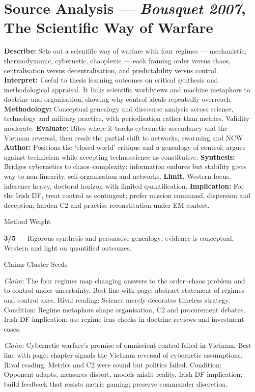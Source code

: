 \section*{Source Analysis — \textit{Bousquet 2007}, The Scientific Way of Warfare}
\textbf{Describe:} Sets out a scientific way of warfare with four regimes — mechanistic, thermodynamic, cybernetic, chaoplexic — each framing order versus chaos, centralisation versus decentralisation, and predictability versus control.
\textbf{Interpret:} Useful to thesis learning outcomes on critical synthesis and methodological appraisal. It links scientific worldviews and machine metaphors to doctrine and organisation, showing why control ideals repeatedly overreach.
\textbf{Methodology:} Conceptual genealogy and discourse analysis across science, technology and military practice, with periodisation rather than metrics. Validity moderate.
\textbf{Evaluate:} Bites where it tracks cybernetic ascendancy and the Vietnam reversal, then reads the partial shift to networks, swarming and NCW.
\textbf{Author:} Positions the ‘closed world’ critique and a genealogy of control; argues against technicism while accepting technoscience as constitutive.
\textbf{Synthesis:} Bridges cybernetics to chaos–complexity: information endures but stability gives way to non-linearity, self-organisation and networks.
\textbf{Limit.} Western focus, inference heavy, doctoral horizon with limited quantification.
\textbf{Implication:} For the Irish DF, treat control as contingent; prefer mission command, dispersion and deception; harden C2 and practise reconstitution under EM contest.

Method Weight

\textbf{3/5} — Rigorous synthesis and persuasive genealogy; evidence is conceptual, Western and light on quantified outcomes.

Claims-Cluster Seeds

\textit{Claim:} The four regimes map changing answers to the order–chaos problem and to control under uncertainty.
Best line with page: abstract statement of regimes and control axes.
Rival reading: Science merely decorates timeless strategy.
Condition: Regime metaphors shape organisation, C2 and procurement debates.
Irish DF implication: use regime-lens checks in doctrine reviews and investment cases.

\textit{Claim:} Cybernetic warfare’s promise of omniscient control failed in Vietnam.
Best line with page: chapter signals the Vietnam reversal of cybernetic assumptions.
Rival reading: Metrics and C2 were sound but politics failed.
Condition: Opponent adapts, measures distort, models misfit reality.
Irish DF implication: build feedback that resists metric gaming; preserve commander discretion.

